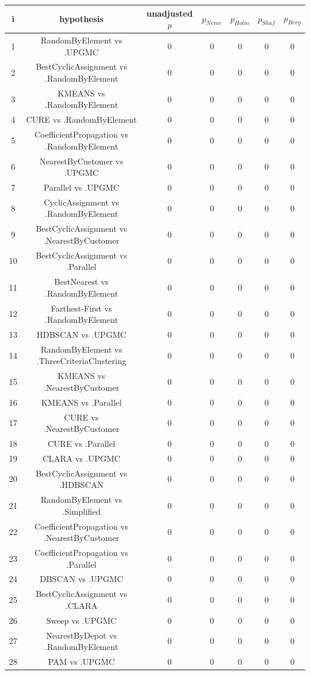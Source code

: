 \documentclass[a4paper,10pt]{article}
\begin{document}
\begin{landscape}
\begin{table}[!htp]
\centering\scriptsize
\begin{tabular}{ccccccc}
i&hypothesis&unadjusted $p$&$p_{Neme}$&$p_{Holm}$&$p_{Shaf}$&$p_{Berg}$\\
\hline1&RandomByElement vs .UPGMC&0&0&0&0&0\\
2&BestCyclicAssignment vs .RandomByElement&0&0&0&0&0\\
3&KMEANS vs .RandomByElement&0&0&0&0&0\\
4&CURE vs .RandomByElement&0&0&0&0&0\\
5&CoefficientPropagation vs .RandomByElement&0&0&0&0&0\\
6&NearestByCustomer vs .UPGMC&0&0&0&0&0\\
7&Parallel vs .UPGMC&0&0&0&0&0\\
8&CyclicAssignment vs .RandomByElement&0&0&0&0&0\\
9&BestCyclicAssignment vs .NearestByCustomer&0&0&0&0&0\\
10&BestCyclicAssignment vs .Parallel&0&0&0&0&0\\
11&BestNearest vs .RandomByElement&0&0&0&0&0\\
12&Farthest-First vs .RandomByElement&0&0&0&0&0\\
13&HDBSCAN vs .UPGMC&0&0&0&0&0\\
14&RandomByElement vs .ThreeCriteriaClustering&0&0&0&0&0\\
15&KMEANS vs .NearestByCustomer&0&0&0&0&0\\
16&KMEANS vs .Parallel&0&0&0&0&0\\
17&CURE vs .NearestByCustomer&0&0&0&0&0\\
18&CURE vs .Parallel&0&0&0&0&0\\
19&CLARA vs .UPGMC&0&0&0&0&0\\
20&BestCyclicAssignment vs .HDBSCAN&0&0&0&0&0\\
21&RandomByElement vs .Simplified&0&0&0&0&0\\
22&CoefficientPropagation vs .NearestByCustomer&0&0&0&0&0\\
23&CoefficientPropagation vs .Parallel&0&0&0&0&0\\
24&DBSCAN vs .UPGMC&0&0&0&0&0\\
25&BestCyclicAssignment vs .CLARA&0&0&0&0&0\\
26&Sweep vs .UPGMC&0&0&0&0&0\\
27&NearestByDepot vs .RandomByElement&0&0&0&0&0\\
28&PAM vs .UPGMC&0&0&0&0&0\\

\end{tabular}
\end{table}
\end{landscape}
\end{document}
